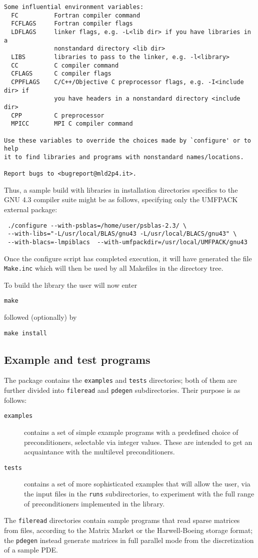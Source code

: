 \begin{verbatim}
Some influential environment variables:
  FC          Fortran compiler command
  FCFLAGS     Fortran compiler flags
  LDFLAGS     linker flags, e.g. -L<lib dir> if you have libraries in a
              nonstandard directory <lib dir>
  LIBS        libraries to pass to the linker, e.g. -l<library>
  CC          C compiler command
  CFLAGS      C compiler flags
  CPPFLAGS    C/C++/Objective C preprocessor flags, e.g. -I<include dir> if
              you have headers in a nonstandard directory <include dir>
  CPP         C preprocessor
  MPICC       MPI C compiler command

Use these variables to override the choices made by `configure' or to help
it to find libraries and programs with nonstandard names/locations.

Report bugs to <bugreport@mld2p4.it>.
\end{verbatim}
Thus, a sample build with libraries in installation
directories specifics to the GNU 4.3 compiler suite might be as
follows, specifying only the UMFPACK external package: 
\begin{verbatim}
 ./configure --with-psblas=/home/user/psblas-2.3/ \
 --with-libs="-L/usr/local/BLAS/gnu43 -L/usr/local/BLACS/gnu43" \
 --with-blacs=-lmpiblacs  --with-umfpackdir=/usr/local/UMFPACK/gnu43 
\end{verbatim}
Once the configure script has completed execution, it will have
generated the file \verb|Make.inc| which will then be used by all
Makefiles in the directory tree. 

To build the library the user will now enter 
\begin{verbatim}
make
\end{verbatim}
followed (optionally) by 
\begin{verbatim}
make install
\end{verbatim}

\subsection{Example and test programs\label{sec:ex_and_test}}
The package contains the \verb|examples| and \verb|tests| directories;
both of them are further divided into \verb|fileread| and
\verb|pdegen| subdirectories. Their purpose is as follows:
\begin{description}
\item[\tt examples] contains a set of simple example programs with a
  predefined choice of preconditioners, selectable via integer
  values. These are intended to get an acquaintance with the
  multilevel preconditioners.
\item[\tt tests] contains a set of more sophisticated examples that
  will allow the user, via the input files in the \verb|runs|
  subdirectories, to experiment with the full range of preconditioners
  implemented in the library.
\end{description}
The \verb|fileread| directories contain sample programs that read
sparse matrices from files, according to the Matrix Market or the
Harwell-Boeing storage format; the \verb|pdegen| instead generate
matrices in full parallel mode from the discretization of a sample PDE. 
